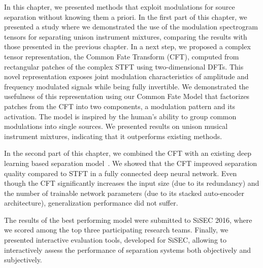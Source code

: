 In this chapter, we presented methods that exploit modulations for source separation without knowing them a priori. 
In the first part of this chapter, we presented a study where we demonstrated the use of the modulation spectrogram tensors for separating unison instrument mixtures, comparing the results with those presented in the previous chapter.
In a next step, we proposed a complex tensor representation, the Common Fate Transform (CFT), computed from rectangular patches of the complex STFT using two-dimensional DFTs.
This novel representation exposes joint modulation characteristics of amplitude and frequency modulated signals while being fully invertible.
We demonstrated the usefulness of this representation using our Common Fate Model that factorizes patches from the CFT into two components, a modulation pattern and its activation. 
The model is inspired by the human's ability to group common modulations into single sources.
We presented results on unison musical instrument mixtures, indicating that it outperforms existing methods.
\par
In the second part of this chapter, we combined the CFT with an existing deep learning based separation model~\cite{uhlich15}.
We showed that the CFT improved separation quality compared to STFT in a fully connected deep neural network.
Even though the CFT significantly increases the input size (due to its redundancy) and the number of trainable network parameters (due to its stacked auto-encoder architecture), generalization performance did not suffer.
\par
The results of the best performing model were submitted to SiSEC 2016, where we scored among the top three participating research teams.
Finally, we presented interactive evaluation tools, developed for SiSEC, allowing to interactively assess the performance of separation systems both objectively and subjectively.